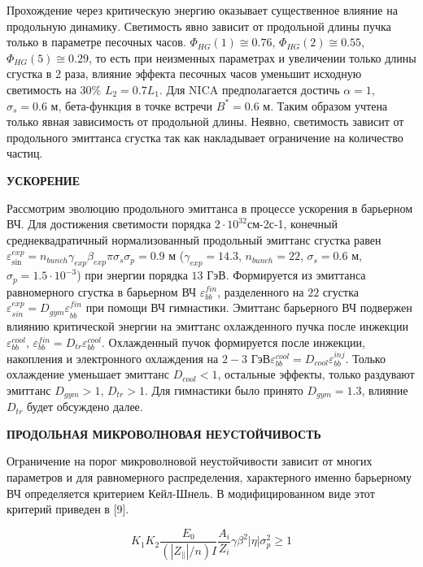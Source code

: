 \par Прохождение через критическую энергию оказывает существенное влияние на продольную динамику. Светимость явно зависит от продольной длины пучка только в параметре песочных часов. $\Phi_{HG}(1)\cong0.76$, $\Phi_{HG}(2)\cong0.55$, $\Phi_{HG}(5)\cong0.29$, то есть при неизменных параметрах и увеличении только длины сгустка в $2$ раза, влияние эффекта песочных часов уменьшит исходную светимость на $30\%$ $L_2=0.7L_1$. Для NICA предполагается достичь $\alpha=1$, $\sigma_s=0.6$ м, бета-функция в точке встречи $B^\ast=0.6$ м. Таким образом учтена только явная зависимость от продольной длины. Неявно, светимость зависит от продольного эмиттанса сгустка так как накладывает ограничение на количество частиц.

	\textbf{УСКОРЕНИЕ}

\par Рассмотрим эволюцию продольного эмиттанса в процессе ускорения в барьерном ВЧ. 
Для достижения светимости порядка $2 \cdot 10^{32}$см-2с-1, конечный среднеквадратичный нормализованный продольный эмиттанс сгустка равен $\varepsilon_{\sin}^{exp}=n_{bunch}\gamma_{exp}\beta_{exp}\pi\sigma_s\sigma_p=0.9$ м ($\gamma_{exp}=14.3$, $n_{bunch}=22$, $\sigma_s=0.6$ м, $\sigma_p=1.5\cdot 10^{-3}$) при энергии порядка $13$ ГэВ. 
Формируется из эмиттанса равномерного сгустка в барьерном ВЧ $\varepsilon_{bb}^{fin}$, разделенного на $22$ сгустка $\varepsilon_{sin}^{exp}={D_{gym}\varepsilon}_{bb}^{fin}$ при помощи ВЧ гимнастики. 
Эмиттанс барьерного ВЧ подвержен влиянию критической энергии на эмиттанс охлажденного пучка после инжекции $\varepsilon_{bb}^{cool}$, $\varepsilon_{bb}^{fin}=D_{tr}\varepsilon_{bb}^{cool}$. 
Охлажденный пучок формируется после инжекции, накопления и электронного охлаждения на $2-3$ ГэВ$\varepsilon_{bb}^{cool}=D_{cool}\varepsilon_{bb}^{inj}$. 
Только охлаждение уменьшает эмиттанс $D_{cool}<1$, остальные эффекты, только раздувают эмиттанс $D_{gym}>1$, $D_{tr}>1$. 
Для гимнастики было принято $D_{gym}=1.3$, влияние $D_{tr}$ будет обсуждено далее.

	\textbf{ПРОДОЛЬНАЯ МИКРОВОЛНОВАЯ НЕУСТОЙЧИВОСТЬ}
	
\par Ограничение на порог микроволновой неустойчивости зависит от многих параметров и для равномерного распределения, характерного именно барьерному ВЧ определяется критерием Кейл-Шнель. В модифицированном виде этот критерий приведен в [9].

\begin{equation}
K_1K_2\frac{E_0}{\left(\left|Z_\parallel\right|/n\right)I}\frac{A_i}{Z_i}\gamma\beta^2|\eta|\sigma_p^2\geq1
\label{eq:microwave_instability}
\end{equation}

